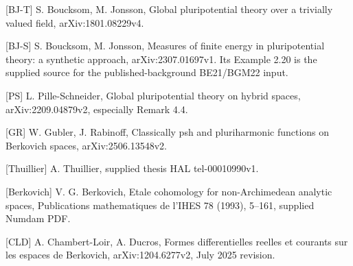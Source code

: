 \documentclass[11pt]{article}
\begin{document}
[BJ-T] S. Boucksom, M. Jonsson, Global pluripotential theory over a trivially valued field, arXiv:1801.08229v4.

[BJ-S] S. Boucksom, M. Jonsson, Measures of finite energy in pluripotential theory: a synthetic approach, arXiv:2307.01697v1. Its Example 2.20 is the supplied source for the published-background BE21/BGM22 input.

[PS] L. Pille-Schneider, Global pluripotential theory on hybrid spaces, arXiv:2209.04879v2, especially Remark 4.4.

[GR] W. Gubler, J. Rabinoff, Classically psh and pluriharmonic functions on Berkovich spaces, arXiv:2506.13548v2.

[Thuillier] A. Thuillier, supplied thesis HAL tel-00010990v1.

[Berkovich] V. G. Berkovich, Etale cohomology for non-Archimedean analytic spaces, Publications mathematiques de l'IHES 78 (1993), 5--161, supplied Numdam PDF.

[CLD] A. Chambert-Loir, A. Ducros, Formes differentielles reelles et courants sur les espaces de Berkovich, arXiv:1204.6277v2, July 2025 revision.
\end{document}
